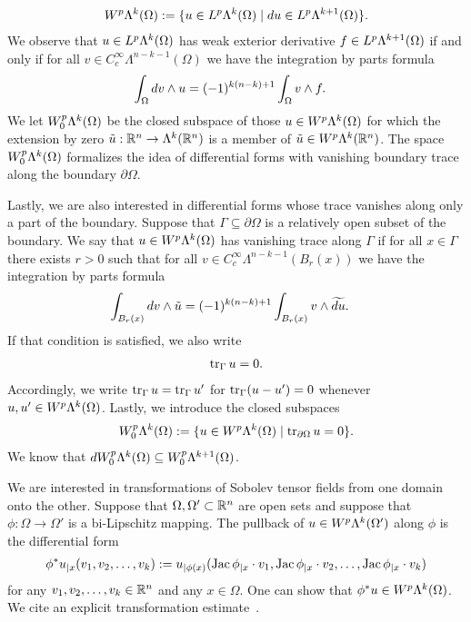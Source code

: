 \documentclass[10pt,letterpaper]{article}
\begin{document}
\begin{gather*}
    W^{p}\Alt^{k}(\Omega) 
    := 
    \{ u \in L^{p}\Alt^{k}(\Omega) \suchthat \cartan u \in L^{p}\Alt^{k+1}(\Omega) \}
    .
\end{gather*}
We observe that $u \in L^{p}\Lambda^{k}(\Omega)$ has weak exterior derivative $f \in L^{p}\Lambda^{k+1}(\Omega)$
if and only if for all $v \in C^{\infty}_{c}\Lambda^{n-k-1}(\Omega)$ we have the integration by parts formula
\begin{align*}
    \int_{\Omega} d v \wedge u
    &=
    (-1)^{k(n-k)+1}
    \int_{\Omega} v \wedge f 
    .
\end{align*}
We let $W^{p}_{0}\Lambda^{k}(\Omega)$ be the closed subspace of those $u \in W^{p}\Lambda^{k}(\Omega)$ 
for which the extension by zero $\tilde u : {\mathbb R}^{n} \rightarrow \Lambda^{k}({\mathbb R}^{n})$ is a member of $\tilde u \in W^{p}\Lambda^{k}({\mathbb R}^{n})$. 
The space $W^{p}_{0}\Lambda^{k}(\Omega)$ formalizes the idea of differential forms with vanishing boundary trace along the boundary $\partial\Omega$. 

Lastly, we are also interested in differential forms whose trace vanishes along only a part of the boundary. 
Suppose that $\Gamma \subseteq \partial\Omega$ is a relatively open subset of the boundary. 
We say that $u \in W^{p}\Lambda^{k}(\Omega)$ has vanishing trace along $\Gamma$ if for all $x \in \Gamma$ there exists $r > 0$
such that for all $v \in C^{\infty}_{c}\Lambda^{n-k-1}(B_r(x))$ we have the integration by parts formula
\begin{align*}
    \int_{B_r(x)} d v \wedge \tilde u
    &=
    (-1)^{k(n-k)+1}
    \int_{B_r(x)} v \wedge \widetilde{d u}
    .
\end{align*}
If that condition is satisfied, we also write 
\begin{align*}
    \operatorname{tr}_{\Gamma} u = 0
    .
\end{align*}
Accordingly, we write $\operatorname{tr}_{\Gamma} u = \operatorname{tr}_{\Gamma} u'$ for $\operatorname{tr}_{\Gamma} (u-u') = 0$ whenever $u, u' \in W^{p}\Lambda^{k}(\Omega)$.
Lastly, we introduce the closed subspaces 
\begin{gather*}
    W^{p}_{0}\Alt^{k}(\Omega) 
    := 
    \{ u \in W^{p}\Alt^{k}(\Omega) \suchthat \trace_{\partial \Omega} u = 0 \}
    .
\end{gather*}
We know that $d W^{p}_{0}\Lambda^{k}(\Omega) \subseteq W^{p}_{0}\Lambda^{k+1}(\Omega)$.


We are interested in transformations of Sobolev tensor fields from one domain onto the other. 
Suppose that $\Omega,\Omega' \subset {\mathbb R}^{n}$ are open sets and suppose that $\phi: \Omega \to \Omega'$ is a bi-Lipschitz mapping.
The pullback of $u \in W^{p}\Lambda^{k}(\Omega')$ along $\phi$ is the differential form 
\begin{gather*} 
    \phi^{\ast}u_{|x}( v_{1}, v_{2}, \ldots, v_{k} ) 
    := 
    u_{|\phi(x)}( \operatorname{{\rm Jac}}\phi_{|x} \cdot v_1, \operatorname{{\rm Jac}}\phi_{|x} \cdot v_2, \ldots, \operatorname{{\rm Jac}}\phi_{|x} \cdot v_k ) 
\end{gather*}
for any $v_1, v_2, \dots, v_k \in {\mathbb R}^{n}$ and any $x \in \Omega$. One can show that $\phi^{\ast}u \in W^{p}\Lambda^{k}(\Omega)$.
We cite an explicit transformation estimate~\cite{licht2019smoothed}.
\end{document}
